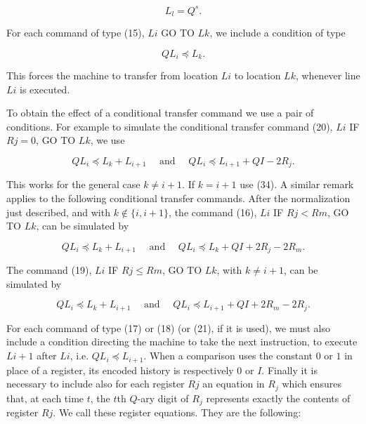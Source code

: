 \documentclass[11pt,leqno]{article}
\begin{document}
\begin{equation*}
L_{l}=Q^{s} . \tag{33}\label{eq:33}
\end{equation*}

For each command of type (15), $L i$ GO TO $L k$, we include a condition of type

\begin{equation*}
Q L_{i} \preccurlyeq L_{k} . \tag{34}\label{eq:34}
\end{equation*}

This forces the machine to transfer from location $L i$ to location $L k$, whenever line $L i$ is executed.

To obtain the effect of a conditional transfer command we use a pair of conditions. For example to simulate the conditional transfer command (20), $L i$ IF $R j=0$, GO TO $L k$, we use

\begin{equation*}
Q L_{i} \preccurlyeq L_{k}+L_{i+1} \quad \text { and } \quad Q L_{i} \preccurlyeq L_{i+1}+Q I-2 R_{j} . \tag{35}\label{eq:35}
\end{equation*}

This works for the general case $k \neq i+1$. If $k=i+1$ use (34). A similar remark applies to the following conditional transfer commands. After the normalization just described, and with $k\notin\{i,i+1\}$, the command (16), $L i$ IF $R j<R m$, GO TO $L k$, can be simulated by

\begin{equation*}
Q L_{i} \preccurlyeq L_{k}+L_{i+1} \quad \text { and } \quad Q L_{i} \preccurlyeq L_{k}+Q I+2 R_{j}-2 R_{m} . \tag{36}\label{eq:36}
\end{equation*}

The command (19), $L i$ IF $R j\leq R m$, GO TO $L k$, with $k\neq i+1$, can be simulated by

\begin{equation*}
Q L_{i} \preccurlyeq L_{k}+L_{i+1} \quad \text { and } \quad Q L_{i} \preccurlyeq L_{i+1}+Q I+2 R_{m}-2 R_{j} . \tag{37}\label{eq:37}
\end{equation*}

For each command of type (17) or (18) (or (21), if it is used), we must also include a condition directing the machine to take the next instruction, to execute $L i+1$ after $L i$, i.e. $Q L_{i} \preccurlyeq L_{i+1}$. When a comparison uses the constant $0$ or $1$ in place of a register, its encoded history is respectively $0$ or $I$. Finally it is necessary to include also for each register $R j$ an equation in $R_{j}$ which ensures that, at each time $t$, the $t$th $Q$-ary digit of $R_{j}$ represents exactly the contents of register $R j$. We call these register equations. They are the following:
\end{document}
